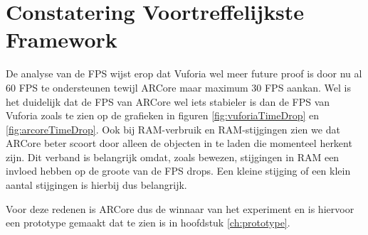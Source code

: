 \section{Constatering Voortreffelijkste Framework}
De analyse van de FPS wijst erop dat Vuforia wel meer future proof is door nu al 60 FPS te ondersteunen tewijl ARCore maar maximum 30 FPS aankan. 
Wel is het duidelijk dat de FPS van ARCore wel iets stabieler is dan de FPS van Vuforia zoals te zien op de grafieken in figuren \ref{fig:vuforiaTimeDrop} en \ref{fig:arcoreTimeDrop}. 
Ook bij RAM-verbruik en RAM-stijgingen zien we dat ARCore beter scoort door alleen de objecten in te laden die momenteel herkent zijn. 
Dit verband is belangrijk omdat, zoals bewezen, stijgingen in RAM een invloed hebben op de groote van de FPS drops.
Een kleine stijging of een klein aantal stijgingen is hierbij dus belangrijk.

Voor deze redenen is ARCore dus de winnaar van het experiment en is hiervoor een prototype gemaakt dat te zien is in hoofdstuk \ref{ch:prototype}.
